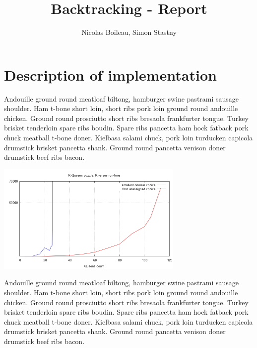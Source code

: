 \documentclass{article}
\begin{document}
\providecommand{\abs}[1]{\lvert#1\rvert}

\title{Backtracking - Report}
\author{Nicolas Boileau, Simon Stastny}

\maketitle

\section{Description of implementation}
Andouille ground round meatloaf biltong, hamburger swine pastrami sausage
shoulder. Ham t-bone short loin, short ribs pork loin ground round andouille
chicken. Ground round prosciutto short ribs bresaola frankfurter tongue. Turkey
brisket tenderloin spare ribs boudin. Spare ribs pancetta ham hock fatback pork
chuck meatball t-bone doner. Kielbasa salami chuck, pork loin turducken capicola
drumstick brisket pancetta shank. Ground round pancetta venison doner drumstick
beef ribs bacon.

\includegraphics[width=340,height=200]{plot/queens.png}

Andouille ground round meatloaf biltong, hamburger swine pastrami sausage
shoulder. Ham t-bone short loin, short ribs pork loin ground round andouille
chicken. Ground round prosciutto short ribs bresaola frankfurter tongue. Turkey
brisket tenderloin spare ribs boudin. Spare ribs pancetta ham hock fatback pork
chuck meatball t-bone doner. Kielbasa salami chuck, pork loin turducken capicola
drumstick brisket pancetta shank. Ground round pancetta venison doner drumstick
beef ribs bacon.
\end{document}
